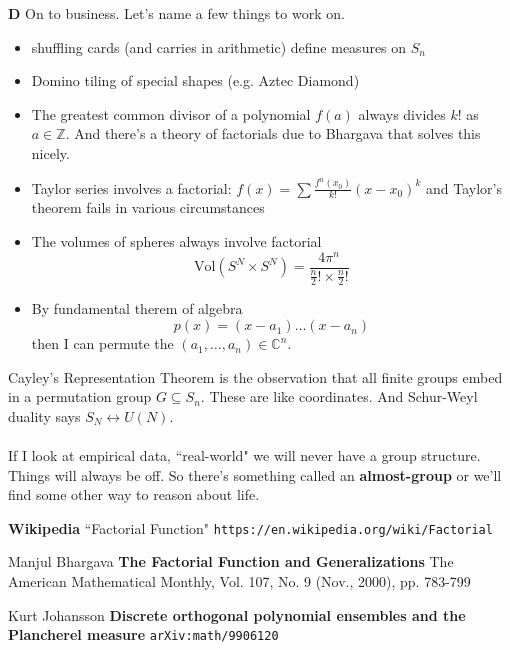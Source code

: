 \documentclass[12pt]{article}
\begin{document}
\newpage

\noindent \textbf{D} On to business.  Let's name a few things to work on.
\begin{itemize}
\item shuffling cards (and carries in arithmetic) define measures on $S_n$
\item Domino tiling of special shapes (e.g. Aztec Diamond) 
\item The greatest common divisor of a polynomial $f(a)$ always divides $k!$ as $a \in \mathbb{Z}$.  And there's a theory of factorials due to Bhargava that solves this nicely.
\item Taylor series involves a factorial: $f(x) = \sum \frac{f^{n}(x_0)}{k!} (x- x_0)^k$ and Taylor's theorem fails in various circumstances
\item The volumes of spheres always involve factorial $$ \mathrm{Vol}(S^N \times S^N) = \frac{4\pi^n}{ \frac{n}{2}! \times \frac{n}{2}! }$$
\item By fundamental therem of algebra $$p(x) = (x-a_1)\dots (x - a_n)$$ then I can permute the $(a_1, \dots, a_n) \in \mathbb{C}^n$.  \\
\end{itemize}
Cayley's Representation Theorem is the observation that all finite groups embed in a permutation group $G \subseteq S_n$. These are like coordinates.  And Schur-Weyl duality says $S_N \leftrightarrow U(N)$. \\ \\
If I look at empirical data, ``real-world" we will never have a group structure.  Things will always be off.  So there's something called an \textbf{almost-group} or we'll find some other way to reason about life.


\newpage

\selectfont \fontsize{12}{10}\selectfont

\begin{thebibliography}{}

\item \textbf{Wikipedia} ``Factorial Function" \texttt{https://en.wikipedia.org/wiki/Factorial}

\item Manjul Bhargava \textbf{The Factorial Function and Generalizations}  The American Mathematical Monthly, Vol. 107, No. 9 (Nov., 2000), pp. 783-799

\item Kurt Johansson \textbf{Discrete orthogonal polynomial ensembles and the Plancherel measure} \texttt{arXiv:math/9906120}

\end{thebibliography}
\end{document}
